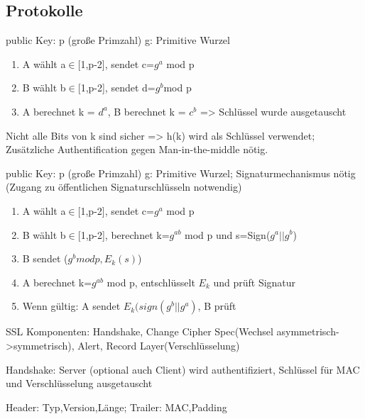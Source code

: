 \subsection*{Protokolle}
public Key: p (große Primzahl) g: Primitive Wurzel
\begin{enumerate}
\item A wählt a$\in$[1,p-2], sendet c=$g^a$ mod p
\item B wählt b$\in$[1,p-2], sendet d=$g^b$mod p
\item A berechnet k = $d^a$, B berechnet k = $c^b$ => Schlüssel wurde ausgetauscht
\end{enumerate}%
Nicht alle Bits von k sind sicher => h(k) wird als Schlüssel verwendet;\\
Zusätzliche Authentification gegen Man-in-the-middle nötig.

public Key: p (große Primzahl) g: Primitive Wurzel; Signaturmechanismus nötig (Zugang zu öffentlichen Signaturschlüsseln notwendig)
\begin{enumerate}
\item A wählt a$\in$[1,p-2], sendet c=$g^a$ mod p
\item B wählt b$\in$[1,p-2], berechnet k=$g^{ab}$ mod p und s=Sign($g^a||g^b$)
\item B sendet ($g^b mod p,E_k(s)$)
\item A berechnet k=$g^{ab}$ mod p, entschlüsselt $E_k$ und prüft Signatur
\item Wenn gültig: A sendet $E_k(sign(g^b||g^a)$, B prüft
\end{enumerate}


SSL Komponenten: Handshake, Change Cipher Spec(Wechsel asymmetrisch->symmetrisch), Alert, Record Layer(Verschlüsselung)

Handshake: Server (optional auch Client) wird authentifiziert, Schlüssel für MAC und Verschlüsselung ausgetauscht

Header: Typ,Version,Länge; Trailer: MAC,Padding

